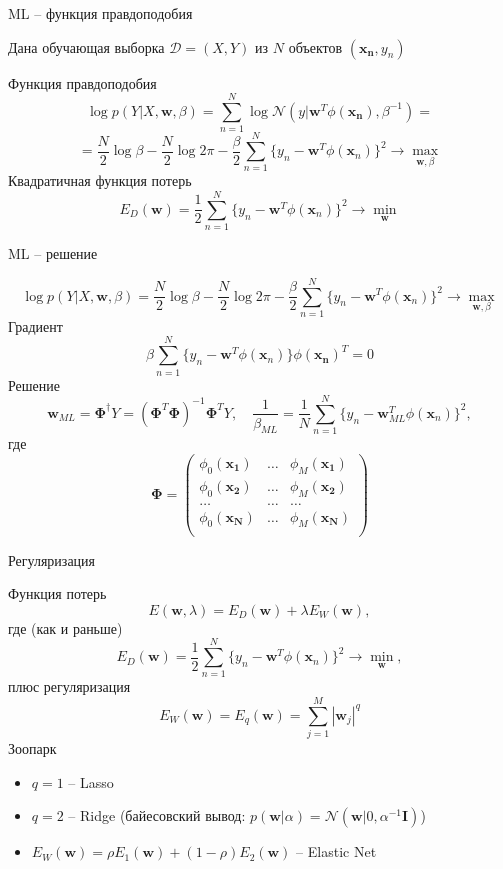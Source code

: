 \documentclass[aspectratio=169]{beamer}
\begin{document}
\begin{frame}{ML -- функция правдоподобия}

Дана обучающая выборка $\mathcal{D} = (X, Y)$ из $N$ объектов $(\mathbf{x_n}, y_n)$

\vspace{1em}
Функция правдоподобия
\[
\log p(Y | X, \mathbf{w}, \beta) = \sum_{n=1}^N \log \mathcal{N}(y | \mathbf{w}^T \phi(\mathbf{x_n}), \beta^{-1}) = 
\]
\[
= \frac{N}{2} \log \beta - \frac{N}{2} \log 2 \pi - \frac{\beta}{2} \sum_{n=1}^N \{y_n - \mathbf{w}^T \phi(\mathbf{x}_n)\}^2 \rightarrow \max_{\mathbf{w}, \beta}
\]
Квадратичная функция потерь
\[
E_D(\mathbf{w}) = \frac 1 2 \sum_{n=1}^N \{y_n - \mathbf{w}^T \phi(\mathbf{x}_n)\}^2 \rightarrow \min_{\mathbf{w}}
\]

\end{frame}

\begin{frame}{ML -- решение}

\[
\log p(Y | X, \mathbf{w}, \beta)
= \frac{N}{2} \log \beta - \frac{N}{2} \log 2 \pi - \frac{\beta}{2} \sum_{n=1}^N \{y_n - \mathbf{w}^T \phi(\mathbf{x}_n)\}^2 \rightarrow \max_{\mathbf{w}, \beta}
\]
Градиент
\[
\beta \sum_{n=1}^N \{y_n - \mathbf{w}^T \phi(\mathbf{x}_n)\} \phi(\mathbf{x_n})^T = 0
\]
Решение
 \[
 \mathbf{w}_{ML} = \mathbf{\Phi}^{\dagger} Y = (\mathbf{\Phi}^T \mathbf{\Phi})^{-1} \mathbf{\Phi}^T Y, \quad
 \frac{1}{\beta_{ML}} = \frac{1}{N} \sum_{n=1}^N \{y_n - \mathbf{w}_{ML}^T \phi(\mathbf{x}_n)\}^2, 
 \]
 где
 \[
 \mathbf{\Phi} = \begin{pmatrix}
 \phi_0(\mathbf{x_1}) & \ldots &  \phi_M(\mathbf{x_1}) \\
 \phi_0(\mathbf{x_2}) & \ldots &  \phi_M(\mathbf{x_2}) \\
 \ldots & \ldots & \ldots \\
  \phi_0(\mathbf{x_N}) & \ldots &  \phi_M(\mathbf{x_N}) \\
 \end{pmatrix}
 \]

\end{frame}

\begin{frame}{Регуляризация}

Функция потерь
\[
E(\mathbf{w}, \lambda) = E_D(\mathbf{w}) + \lambda E_W(\mathbf{w}),
\]
где (как и раньше)
\[
E_D(\mathbf{w}) = \frac 1 2 \sum_{n=1}^N \{y_n - \mathbf{w}^T \phi(\mathbf{x}_n)\}^2 \rightarrow \min_{\mathbf{w}},
\]
плюс регуляризация
\[
E_W(\mathbf{w}) = E_q(\mathbf{w}) = \sum_{j=1}^M |\mathbf{w}_j|^q
\]
Зоопарк
\begin{itemize}
\item $q = 1$ -- Lasso
\item $q = 2$ -- Ridge (байесовский вывод: $p(\mathbf{w} | \alpha) = \mathcal{N}(\mathbf{w} | 0, \alpha^{-1} \mathbf{I})$)
\item $E_W(\mathbf{w}) = \rho E_1(\mathbf{w}) + (1 - \rho) E_2(\mathbf{w})$ -- Elastic Net
\end{itemize}

\end{frame}
\end{document}
